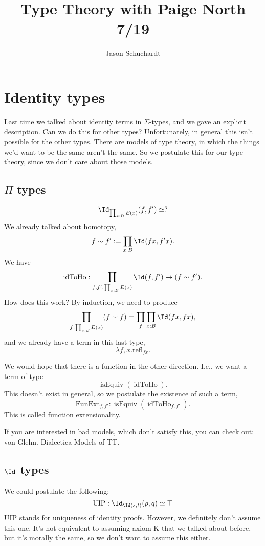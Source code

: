 \documentclass{article}
\title{Type Theory with Paige North 7/19}
\author{Jason Schuchardt}
\newcommand\pred[1]{\operatorname{#1}}
\newcommand\isEquiv{\pred{isEquiv}}
\newcommand\refl{\mathrm{refl}}
\newcommand\FunExt{\mathrm{FunExt}}
\begin{document}
\maketitle

\section{Identity types}

Last time we talked about identity terms in $\Sigma$-types,
and we gave an explicit description. Can we do this for 
other types? Unfortunately, in general this isn't possible 
for the other types. There are models of type theory,
in which the things we'd want to be the same aren't the 
same. So we postulate this for our type theory, since we 
don't care about those models.

\subsection{$\Pi$ types}

\[\Id_{\prod_{x:B}E(x)} (f,f') \simeq ? \]
We already talked about homotopy,
\[ f\sim f' := \prod_{x:B} \Id(fx,f'x). \]
We have 
\[\pred{idToHo}:\prod_{f,f':\prod_{x:B}E(x)} \Id(f,f') \to (f\sim f').\]
How does this work?
By induction, we need to produce 
\[\prod_{f:\prod_{x:B}E(x)} (f\sim f) 
= \prod_{f}\prod_{x:B} \Id(fx,fx),\]
and we already have a term in this last 
type,
\[\lambda f,x. \refl_{fx} .\]

We would hope that there is a function in the other direction.
I.e., we want a term of type 
\[\isEquiv(\pred{idToHo}).\]
This doesn't exist in general, so we postulate the existence 
of such a term,
\[ \FunExt_{f,f'} : \isEquiv(\pred{idToHo}_{f,f'}). \]
This is called function extensionality.

If you are interested in bad models, which don't satisfy this,
you can check out: von Glehn. Dialectica Models of TT.

\subsection{$\Id$ types}

We could postulate the following:
\[\pred{UIP}:\Id_{\Id(s,t)}(p,q) \simeq \top \]
UIP stands for uniqueness of identity proofs.
However, we definitely don't assume this one.
It's not equivalent to assuming axiom K that 
we talked about before, but it's morally the
same, so we don't want to assume this either.
\end{document}
